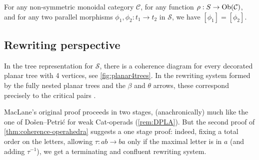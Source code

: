 \begin{corollary}
\label{cor:MacLane}
    For any non-symmetric monoidal category $\mathcal{C}$, for any function $\rho : S \to \mathrm{Ob}(\mathcal{C})$, and for any two parallel morphisms $\phi_1,\phi_2: t_1 \to t_2$ in $\mathcal{S}$, we have $[\phi_1]=[\phi_2]$.
\end{corollary}



\subsection{Rewriting perspective}

\begin{rem}
    In the tree representation for $\mathcal{S}$, there is a coherence diagram for every decorated planar tree with 4 vertices, see \cref{fig:planar4trees}.
    In the rewriting system formed by the fully nested planar trees and the $\beta$ and $\theta$ arrows, these correspond precisely to the critical pairs \cite[Section 6.2]{baaderTermRewritingAll1998}.
\end{rem}

\begin{rem}
\label{rem:29}
MacLane's original proof \cite{MacLane63} proceeds in two stages, (anachronically) much like the one of Do{\v s}en--Petri{\'c} for weak Cat-operads (\cref{rem:DPLA}).
But the second proof of \cref{thm:coherence-operahedra} suggests a one stage proof: indeed, fixing a total order on the letters, allowing $\tau: ab \to ba$ only if the maximal letter is in $a$ (and adding $\tau^{-1}$), we get a terminating and confluent rewriting system. 
\end{rem}



